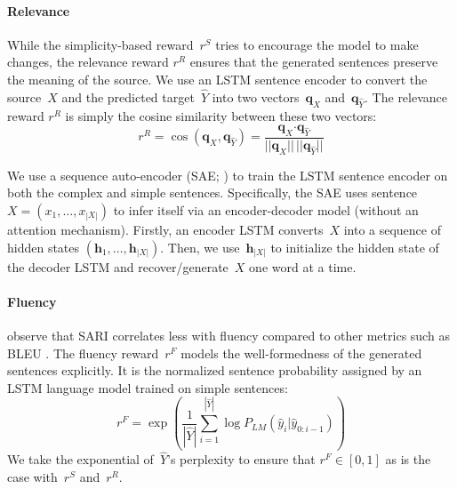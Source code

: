 \documentclass[11pt,letterpaper]{article}
\begin{document}
\paragraph{Relevance} While the simplicity-based reward~$r^S$ tries to
encourage the model to make changes, the relevance reward $r^R$
ensures that the generated sentences preserve the meaning of the
source. We use an LSTM sentence encoder to convert the source~$X$ and
the predicted target~$\hat{Y}$ into two vectors~$\mathbf{q}_X$
and~$\mathbf{q}_{\hat{Y}}$. The relevance reward $r^{R}$ is simply the
cosine similarity between these two vectors:
\begin{equation}
\label{eq:relevance}
r^{R} = \cos( \mathbf{q}_{X}, \mathbf{q}_{\hat{Y}} ) = \frac{  \mathbf{q}_{X} \boldsymbol{\cdot}  
	\mathbf{q}_{\hat{Y}} }{ || \mathbf{q}_{X} || \, || \mathbf{q}_{\hat{Y}} || }  
\end{equation}


We use a sequence auto-encoder (SAE; \citealt{dai2015semi}) to train
the LSTM sentence encoder on both the complex and simple
sentences. Specifically, the SAE uses sentence $X=(x_1,\dots,x_{|X|})$
to infer itself via an encoder-decoder model (without an attention
mechanism).  Firstly, an encoder LSTM converts~$X$ into a sequence of
hidden states $(\mathbf{h}_1,\dots, \mathbf{h}_{|X|})$. Then, we
use~$\mathbf{h}_{|X|}$ to initialize the hidden state of the decoder
LSTM and recover/generate~$X$ one word at a time. 


\paragraph{Fluency}  observe that SARI correlates
less with fluency compared to other metrics such as BLEU
\cite{papineni:2002}.  The fluency reward~$r^F$ models the
well-formedness of the generated sentences explicitly. It is the
normalized sentence probability assigned by an LSTM language model
trained on simple sentences:
\begin{equation}
r^F = \exp \left( \frac{1}{|\hat{Y}|} \sum_{i=1}^{|\hat{Y}|} \log P_{LM}(\hat{y}_i|\hat{y}_{0:i-1}) \right)
\end{equation}
We take the exponential of~$\hat{Y}$'s perplexity to ensure that
\mbox{$r^F \in [0, 1]$} as is the case with~$r^S$ and~$r^R$.
\end{document}
